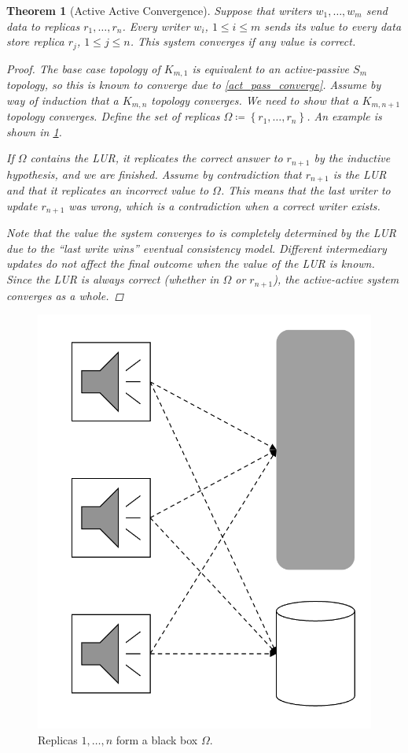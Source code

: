 \documentclass[12pt]{article}
\newtheorem{theorem}{Theorem}%
\newcommand{\set}[1]{\ensuremath{\left\{#1\right\}}}
\begin{document}
\begin{theorem}[Active Active Convergence] \label{act_act_converge}
	Suppose that writers \(w_1, \dotsc, w_m\) send data to replicas \(r_1, \dotsc, r_n\). Every writer \(w_i\), \(1 \leq i \leq m\) sends its value to every data store replica \(r_j\), \(1 \leq j \leq n\). This system converges if any value is correct.
	\begin{proof}
		The base case topology of \(K_{m, 1}\) is equivalent to an active-passive \(S_m\) topology, so this is known to converge due to \cref{act_pass_converge}. Assume by way of induction that a \(K_{m, n}\) topology converges. We need to show that a \(K_{m, n + 1}\) topology converges. Define the set of replicas \(\Omega \coloneqq \set{r_1, \dotsc, r_n}\). An example is shown in \cref{induct_img}.
		
		If \(\Omega\) contains the LUR, it replicates the correct answer to \(r_{n + 1}\) by the inductive hypothesis, and we are finished. Assume by contradiction that \(r_{n + 1}\) is the LUR and that it replicates an incorrect value to \(\Omega\). This means that the last writer to update \(r_{n + 1}\) was wrong, which is a contradiction when a correct writer exists.

		Note that the value the system converges to is completely determined by the LUR due to the ``last write wins'' eventual consistency model. Different intermediary updates do not affect the final outcome when the value of the LUR is known. Since the LUR is always correct (whether in \(\Omega\) or \(r_{n + 1}\)), the active-active system converges as a whole.
	\end{proof}
\end{theorem}

\begin{figure}[htbp]
	\centering
	\includegraphics[width=.45\textwidth]{induct.png}
	\caption{Replicas \(1, \dotsc, n\) form a black box \(\Omega\).}
	\label{induct_img}
\end{figure}
\end{document}
